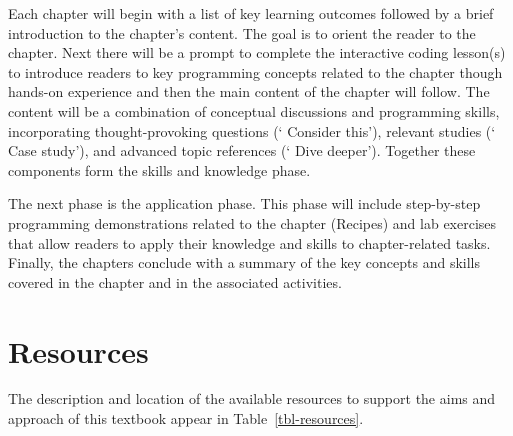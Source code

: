 \documentclass[
  letterpaper,
  krantz1]{latex/krantz-mod}
\theoremstyle{definition}
\theoremstyle{definition}
\theoremstyle{remark}
\begin{document}
Each chapter will begin with a list of key learning outcomes followed by
a brief introduction to the chapter's content. The goal is to orient the
reader to the chapter. Next there will be a prompt to complete the
interactive coding lesson(s) to introduce readers to key programming
concepts related to the chapter though hands-on experience and then the
main content of the chapter will follow. The content will be a
combination of conceptual discussions and programming skills,
incorporating thought-provoking questions (` Consider
this'), relevant studies (` Case study'), and advanced
topic references (` Dive deeper'). Together these
components form the skills and knowledge phase.

The next phase is the application phase. This phase will include
step-by-step programming demonstrations related to the chapter (Recipes)
and lab exercises that allow readers to apply their knowledge and skills
to chapter-related tasks. Finally, the chapters conclude with a summary
of the key concepts and skills covered in the chapter and in the
associated activities.

\section*{Resources}\label{sec-preface-resources}


The description and location of the available resources to support the
aims and approach of this textbook appear in Table~\ref{tbl-resources}.
\end{document}
